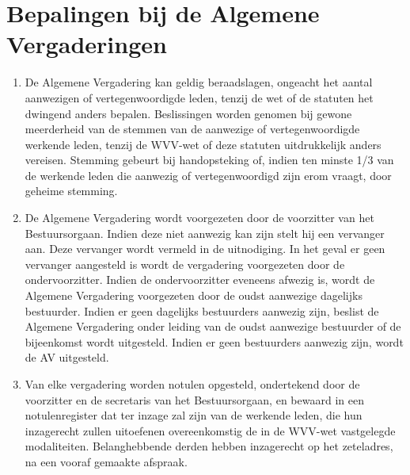     \section{Bepalingen bij de Algemene Vergaderingen}
    \begin{enumerate}
    \item De Algemene Vergadering kan geldig beraadslagen, ongeacht het aantal aanwezigen of vertegenwoordigde leden, tenzij de wet of de statuten het dwingend anders bepalen. Beslissingen worden genomen bij gewone meerderheid van de stemmen van de aanwezige of vertegenwoordigde werkende leden, tenzij de WVV-wet of deze statuten uitdrukkelijk anders vereisen. Stemming gebeurt bij handopsteking of, indien ten minste 1/3 van de werkende leden die aanwezig of vertegenwoordigd zijn erom vraagt, door geheime stemming.
    \item De Algemene Vergadering wordt voorgezeten door de voorzitter van het Bestuursorgaan. Indien deze niet aanwezig kan zijn stelt hij een vervanger aan. Deze vervanger wordt vermeld in de uitnodiging. In het geval er geen vervanger aangesteld is wordt de vergadering voorgezeten door de ondervoorzitter. Indien de ondervoorzitter eveneens afwezig is, wordt de Algemene Vergadering voorgezeten door de oudst aanwezige dagelijks bestuurder. Indien er geen dagelijks bestuurders aanwezig zijn, beslist de Algemene Vergadering onder leiding van de oudst aanwezige bestuurder of de bijeenkomst wordt uitgesteld. Indien er geen bestuurders aanwezig zijn, wordt de AV uitgesteld.
    \item Van elke vergadering worden notulen opgesteld, ondertekend door de voorzitter en de secretaris van het Bestuursorgaan, en bewaard in een notulenregister dat ter inzage zal zijn van de werkende leden, die hun inzagerecht zullen uitoefenen overeenkomstig de in de WVV-wet vastgelegde modaliteiten. Belanghebbende derden hebben inzagerecht op het zeteladres, na een vooraf gemaakte afspraak.
    \end{enumerate}

    
